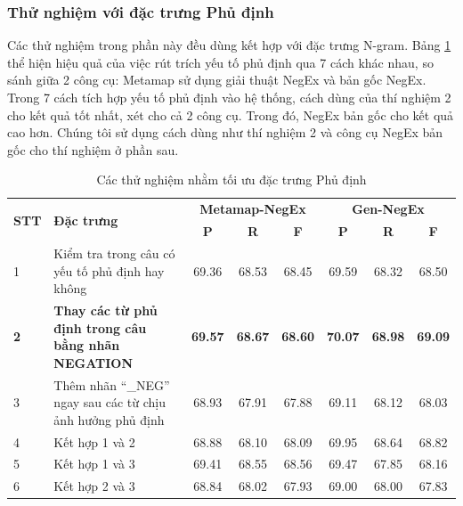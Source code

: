\subsubsection*{Thử nghiệm với đặc trưng Phủ định}
Các thử nghiệm trong phần này đều dùng kết hợp với đặc trưng N-gram. Bảng \ref{table:negation} thể hiện hiệu quả của việc rút trích yếu tố phủ định qua 7 cách khác nhau, so sánh giữa 2 công cụ: Metamap sử dụng giải thuật NegEx và bản gốc NegEx. Trong 7 cách tích hợp yếu tố phủ định vào hệ thống, cách dùng của thí nghiệm 2 cho kết quả tốt nhất, xét cho cả 2 công cụ. Trong đó, NegEx bản gốc cho kết quả cao hơn. Chúng tôi sử dụng cách dùng như thí nghiệm 2 và công cụ NegEx bản gốc cho thí nghiệm ở phần sau.
\begin{table}[H]
\centering
\begin{minipage}{1\textwidth}
\caption{Các thử nghiệm nhằm tối ưu đặc trưng Phủ định} \label{table:negation}
\begin{tabular}{|l|m{}|ccc|ccc|}
\hline
\multirow{2}{*}{\textbf{STT}} & \multirow{2}{*}{\textbf{Đặc trưng}} & \multicolumn{3}{c|}{\textbf{Metamap-NegEx}} & \multicolumn{3}{c|}{\textbf{Gen-NegEx}}  \\ \cline{3-8}
                     &                            & \textbf{P}           & \textbf{R}           & \textbf{F}           & \textbf{P}        & \textbf{R}        & \textbf{F}        \\
\hline
1 & Kiểm tra trong câu có yếu tố phủ định hay không& 69.36 & 68.53 & 68.45 &
69.59 & 68.32 & 68.50 \\ \hline

\textbf{2} & \textbf{Thay các từ phủ định trong câu bằng nhãn NEGATION} & \textbf{69.57} & \textbf{68.67} & \textbf{68.60} & 
\textbf{70.07} & \textbf{68.98} & \textbf{69.09} \\ \hline

3 & Thêm nhãn ``\_NEG'' ngay sau các từ chịu ảnh hưởng phủ định & 68.93 & 67.91 & 67.88 &
69.11 & 68.12 & 68.03 \\ \hline

4 & Kết hợp 1 và 2 & 68.88 & 68.10 & 68.09 &
69.95 & 68.64 & 68.82 \\ \hline

5 & Kết hợp 1 và 3 & 69.41 & 68.55  & 68.56 &
69.47 & 67.85 & 68.16 \\ \hline

6 & Kết hợp 2 và 3 & 68.84 & 68.02 & 67.93 &
69.00 & 68.00 & 67.83 \\ \hline


\end{tabular}
\end{minipage}
\end{table}
